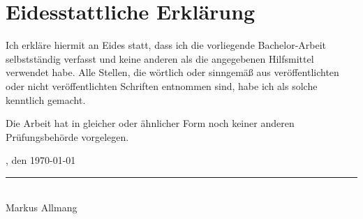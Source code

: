 \chapter*{Eidesstattliche Erklärung}

Ich erkläre hiermit an Eides statt, dass ich die vorliegende Bachelor-Arbeit selbstständig
verfasst und keine anderen als die angegebenen Hilfsmittel verwendet habe.
Alle Stellen, die wörtlich oder sinngemäß aus veröffentlichten oder nicht veröffentlichten
Schriften entnommen sind, habe ich als solche kenntlich gemacht.

Die Arbeit hat in gleicher oder ähnlicher Form noch keiner anderen Prüfungsbehörde vorgelegen.

\vspace{3cm}

\noindent
[Ort], den \today

\vspace{2cm}

\noindent
\rule{7cm}{0.4pt}\\
Markus Allmang
